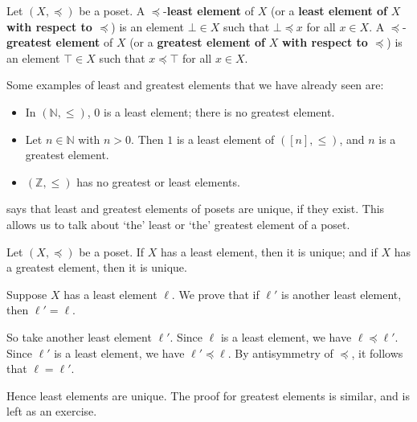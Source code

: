 \begin{definition}
Let $(X, \preceq)$ be a poset. A $\preceq$-\textbf{least element} of $X$ (or a \textbf{least element of} $X$ \textbf{with respect to $\preceq$}) is an element $\bot \in X$  such that $\bot \preceq x$ for all $x \in X$. A $\preceq$-\textbf{greatest element} of $X$ (or a \textbf{greatest element of} $X$ \textbf{with respect to $\preceq$}) is an element $\top \in X$  such that $x \preceq \top$ for all $x \in X$.
\end{definition}

\begin{example}
Some examples of least and greatest elements that we have already seen are:
\begin{itemize}
\item In $(\mathbb{N}, \le)$, $0$ is a least element; there is no greatest element.
\item Let $n \in \mathbb{N}$ with $n > 0$. Then $1$ is a least element of $([n], \le)$, and $n$ is a greatest element.
\item $(\mathbb{Z}, \le)$ has no greatest or least elements.
\end{itemize}
\end{example}

 says that least and greatest elements of posets are unique, if they exist. This allows us to talk about `the' least or `the' greatest element of a poset.

\begin{proposition}
\label{propLeastGreatestElementsUnique}
Let $(X, \preceq)$ be a poset. If $X$ has a least element, then it is unique; and if $X$ has a greatest element, then it is unique.
\end{proposition}
\begin{cproof}
Suppose $X$ has a least element $\ell$. We prove that if $\ell'$ is another least element, then $\ell' = \ell$.

So take another least element $\ell'$. Since $\ell$ is a least element, we have $\ell \preceq \ell'$. Since $\ell'$ is a least element, we have $\ell' \preceq \ell$. By antisymmetry of $\preceq$, it follows that $\ell = \ell'$.

Hence least elements are unique. The proof for greatest elements is similar, and is left as an exercise.
\end{cproof}

